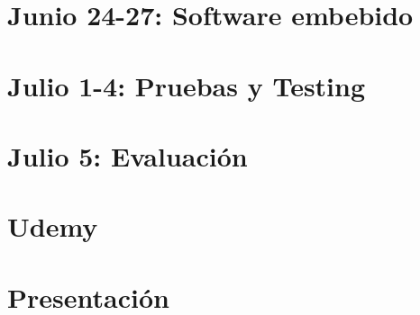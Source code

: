 \section*{Junio 24-27: Software embebido}
\label{sec:jun24-27}

\section*{Julio 1-4: Pruebas y Testing}
\label{sec:jul1-4}

\section*{Julio 5: Evaluación}
\label{sec:jul5}

\section*{Udemy}
\label{sec:udemy}

\section*{Presentación}
\label{sec:presentacion}

